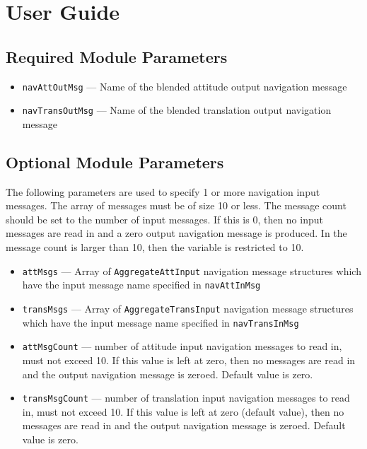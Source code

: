 
\section{User Guide}
\subsection{Required Module Parameters}
\begin{itemize}
	\item {\tt navAttOutMsg} --- Name of the blended attitude output navigation message 
	\item {\tt navTransOutMsg} --- Name of the blended translation output navigation message 
\end{itemize}


\subsection{Optional Module Parameters}
The following parameters are used to specify 1 or more navigation input messages.  The array of messages must be of size 10 or less.  The message count should be set to the number of input messages.  If this is 0, then no input messages are read in and a zero output navigation message is produced.  In the message count is larger than 10, then the variable is restricted to 10.  
\begin{itemize}
	\item {\tt attMsgs} --- Array of {\tt AggregateAttInput} navigation message structures which have the input message name specified in {\tt navAttInMsg}
	\item {\tt transMsgs} --- Array of {\tt AggregateTransInput} navigation message structures which have the input message name specified in {\tt navTransInMsg}
	\item {\tt attMsgCount} --- number of attitude input navigation messages to read in, must not exceed 10.  If this value is left at zero, then no messages are read in and the output navigation message is zeroed. Default value is zero.
	\item {\tt transMsgCount} --- number of translation input navigation messages to read in, must not exceed 10.  If this value is left at zero (default value), then no messages are read in and the output navigation message is zeroed.  Default value is zero.
\end{itemize}



